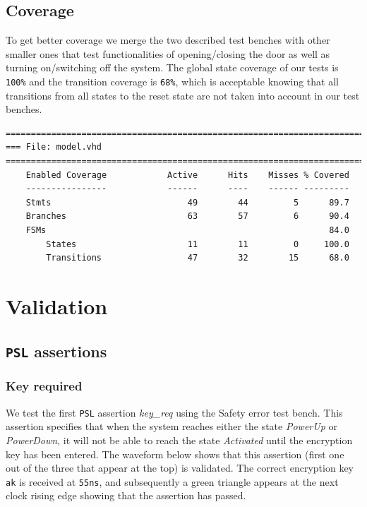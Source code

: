 \documentclass[a4paper,11pt]{article}
\begin{document}
    \subsection{Coverage}
	\par To get better coverage we merge the two described test benches with other smaller ones that test functionalities of opening/closing the door as well as turning on/switching off the system. The global state coverage of our tests is \texttt{100\%} and the transition coverage is \texttt{68\%}, which is acceptable knowing that all transitions from all states to the reset state are not taken into account in our test benches.
	
	\begin{verbatim}
=================================================================================
=== File: model.vhd
=================================================================================
    Enabled Coverage            Active      Hits    Misses % Covered
    ----------------            ------      ----    ------ ---------
    Stmts                           49        44         5      89.7
    Branches                        63        57         6      90.4
    FSMs                                                        84.0
        States                      11        11         0     100.0
        Transitions                 47        32        15      68.0
	\end{verbatim}
    
    \section{Validation}
    
    \subsection{\texttt{PSL} assertions}
    \subsubsection{Key required}
    We test the first \texttt{PSL} assertion \textit{key\_req} using the Safety error test bench. This assertion specifies that when the system reaches either the state  \textit{PowerUp} or  \textit{PowerDown}, it will not be able to reach the state \textit{Activated} until the encryption key has been entered. The waveform below shows that this assertion (first one out of the three that appear at the top) is validated. The correct encryption key \texttt{ak} is received at \texttt{55ns}, and subsequently a green triangle appears at the next clock rising edge showing that the assertion has passed.
    
\end{document}
